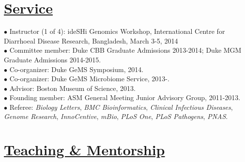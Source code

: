 \documentclass[overlapped,line,11pt]{res}
\begin{document}
\begin{resume}
\section{\underline{\sc Service}}
\vspace{.05in}

\hangindent=0.5in $\bullet$\hspace{.1in} Instructor (1 of 4): ideSHi
Genomics Workshop, International Centre for Diarrhoeal
Disease Research, Bangladesh, March 3-5, 2014 \\

\vspace{-10mm}
\hangindent=0.5in $\bullet$\hspace{.1in} Committee member: Duke CBB
Graduate Admissions 2013-2014; Duke MGM Graduate Admissions 2014-2015. \\

\vspace{-10mm}
\hangindent=0.5in $\bullet$\hspace{.1in} Co-organizer: Duke GeMS
Symposium, 2014. \\

\vspace{-10mm}
\hangindent=0.5in $\bullet$\hspace{.1in} Co-organizer: Duke GeMS
Microbiome Service, 2013-. \\

\vspace{-10mm}
\hangindent=0.5in $\bullet$\hspace{.1in} Advisor: Boston Museum of
Science, 2013. \\

\vspace{-10mm}
\hangindent=0.5in $\bullet$\hspace{.1in} Founding member: ASM General Meeting
Junior Advisory Group, 2011-2013. \\

\vspace{-10mm} \hangindent=0.5in $\bullet$\hspace{.1in} Referee:
\emph{Biology Letters}, \emph{BMC Bioinformatics}, \emph{Clinical
  Infectious Diseases}, \emph{Genome
  Research}, \emph{InnoCentive}, \emph{mBio}, \emph{PLoS One},
\emph{PLoS Pathogens}, \emph{PNAS}.


\section{\underline{\sc Teaching \& Mentorship}}
\vspace{.05in}


\end{resume}
\end{document}
